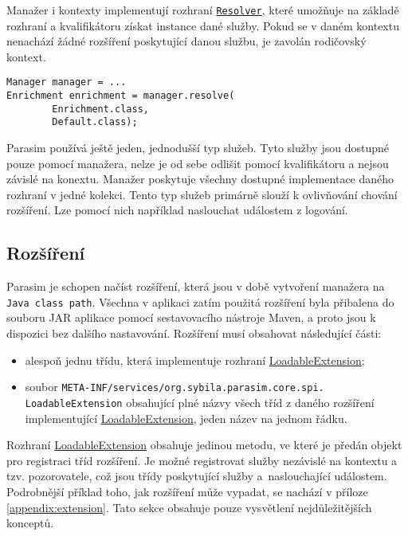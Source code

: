 Manažer i kontexty implementují rozhraní \href{https://github.com/sybila/parasim/blob/2.0.0.Final/core/src/main/java/org/sybila/parasim/core/api/Resolver.java}{\texttt{Resolver}},
které umožňuje na základě rozhraní a kvalifikátoru získat instance dané služby.
Pokud se v daném kontextu nenachází žádné rozšíření poskytující danou službu,
je zavolán rodičovský kontext. 

\begin{lstlisting}[label={code:resolve}, caption={Získání instance služby}, style=Java]
Manager manager = ...
Enrichment enrichment = manager.resolve(
		Enrichment.class,
		Default.class);
\end{lstlisting}

Parasim používá ještě jeden, jednodušší typ služeb. Tyto služby jsou dostupné pouze
pomocí manažera, nelze je od sebe odlišit pomocí kvalifikátoru a nejsou závislé na konextu.
Manažer poskytuje všechny dostupné implementace daného rozhraní v jedné kolekci. Tento typ služeb
primárně  slouží k ovlivňování cho\-vání rozšíření. Lze pomocí nich například
naslouchat událostem z logování.

\subsection{Rozšíření}

Parasim je schopen načíst rozšíření, která jsou v době vytvoření manažera na \texttt{Java class path}.
Všechna v aplikaci zatím použitá rozšíření byla přibalena do souboru JAR aplikace pomocí sestavovacího
nástroje Maven, a proto jsou k dispozici bez dalšího nasta\-vo\-vá\-ní. Rozšíření musí obsahovat
následující části:

\begin{itemize}
	\item	alespoň jednu třídu, která implementuje rozhraní \href{https://github.com/sybila/parasim/blob/2.0.0.Final/core/src/main/java/org/sybila/parasim/core/spi/LoadableExtension.java}{LoadableExtension};
	\item	soubor \texttt{META-INF/services/org.sybila.parasim.core.spi.\\LoadableExtension} obsahující plné názvy všech tříd z daného roz\-ší\-ření implementující \href{https://github.com/sybila/parasim/blob/2.0.0.Final/core/src/main/java/org/sybila/parasim/core/spi/LoadableExtension.java}{LoadableExtension}, jeden název na jednom řád\-ku. 
\end{itemize}

Rozhraní \href{https://github.com/sybila/parasim/blob/2.0.0.Final/core/src/main/java/org/sybila/parasim/core/spi/LoadableExtension.java}{LoadableExtension}
obsahuje jedinou metodu, ve které je pře\-dán objekt pro registraci tříd rozšíření. Je možné
registrovat služby ne\-zá\-vi\-slé na kontextu a tzv. pozorovatele, což jsou třídy poskytující
služby a~na\-slou\-cha\-jí\-cí událostem. Podrobnější příklad toho, jak rozšíření může vypadat,
se nachází v příloze \ref{appendix:extension}. Tato sekce obsahuje pouze vysvětlení
nej\-dů\-le\-ži\-těj\-ších konceptů.

